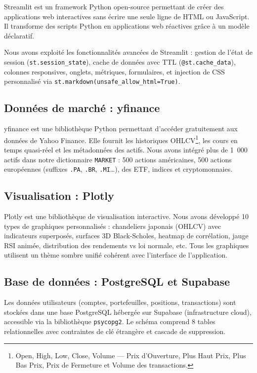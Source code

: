 \documentclass[a4paper, 12pt, twoside]{article}
\begin{document}
Streamlit est un framework Python open-source permettant de créer des
applications web interactives sans écrire une seule ligne de HTML ou
JavaScript. Il transforme des scripts Python en applications web
réactives grâce à un modèle déclaratif.

Nous avons exploité les fonctionnalités avancées de Streamlit : gestion
de l'état de session (\texttt{st.session\_state}), cache de données avec
TTL (\texttt{@st.cache\_data}), colonnes responsives, onglets, métriques,
formulaires, et injection de CSS personnalisé via
\texttt{st.markdown(unsafe\_allow\_html=True)}.

\subsection{Données de marché : yfinance}

yfinance est une bibliothèque Python permettant d'accéder gratuitement
aux données de Yahoo Finance. Elle fournit les historiques OHLCV\footnote{Open, High, Low, Close, Volume --- Prix d'Ouverture, Plus Haut Prix, Plus Bas Prix, Prix de Fermeture et Volume des transactions.},
les cours en temps quasi-réel et les métadonnées des actifs. Nous avons
intégré plus de 1~000 actifs dans notre dictionnaire \texttt{MARKET} :
500 actions américaines, 500 actions européennes (suffixes
\texttt{.PA}, \texttt{.BR}, \texttt{.MI}\ldots), des ETF, indices et
cryptomonnaies.

\subsection{Visualisation : Plotly}

Plotly est une bibliothèque de visualisation interactive. Nous avons
développé 10 types de graphiques personnalisés : chandeliers japonais
(OHLCV) avec indicateurs superposés, surfaces 3D Black-Scholes, heatmap
de corrélation, jauge RSI animée, distribution des rendements vs loi
normale, etc. Tous les graphiques utilisent un thème sombre unifié
cohérent avec l'interface de l'application.

\subsection{Base de données : PostgreSQL et Supabase}

Les données utilisateurs (comptes, portefeuilles, positions,
transactions) sont stockées dans une base PostgreSQL hébergée sur
Supabase (infrastructure cloud), accessible via la bibliothèque
\texttt{psycopg2}. Le schéma comprend 8 tables relationnelles avec
contraintes de clé étrangère et cascade de suppression.
\end{document}
